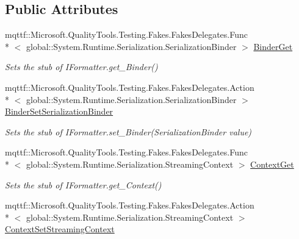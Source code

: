 \subsection*{Public Attributes}
\begin{DoxyCompactItemize}
\item 
mqttf\-::\-Microsoft.\-Quality\-Tools.\-Testing.\-Fakes.\-Fakes\-Delegates.\-Func\\*
$<$ global\-::\-System.\-Runtime.\-Serialization.\-Serialization\-Binder $>$ \hyperlink{class_system_1_1_runtime_1_1_remoting_1_1_messaging_1_1_fakes_1_1_stub_i_remoting_formatter_a4976f8ab0fe1e454d29d12ccabdc4bbf}{Binder\-Get}
\begin{DoxyCompactList}\small\item\em Sets the stub of I\-Formatter.\-get\-\_\-\-Binder()\end{DoxyCompactList}\item 
mqttf\-::\-Microsoft.\-Quality\-Tools.\-Testing.\-Fakes.\-Fakes\-Delegates.\-Action\\*
$<$ global\-::\-System.\-Runtime.\-Serialization.\-Serialization\-Binder $>$ \hyperlink{class_system_1_1_runtime_1_1_remoting_1_1_messaging_1_1_fakes_1_1_stub_i_remoting_formatter_aa34127514fb539c8806ea0e1c717f7be}{Binder\-Set\-Serialization\-Binder}
\begin{DoxyCompactList}\small\item\em Sets the stub of I\-Formatter.\-set\-\_\-\-Binder(\-Serialization\-Binder value)\end{DoxyCompactList}\item 
mqttf\-::\-Microsoft.\-Quality\-Tools.\-Testing.\-Fakes.\-Fakes\-Delegates.\-Func\\*
$<$ global\-::\-System.\-Runtime.\-Serialization.\-Streaming\-Context $>$ \hyperlink{class_system_1_1_runtime_1_1_remoting_1_1_messaging_1_1_fakes_1_1_stub_i_remoting_formatter_a2c4de1f2e75875b4d32f88f904d378b4}{Context\-Get}
\begin{DoxyCompactList}\small\item\em Sets the stub of I\-Formatter.\-get\-\_\-\-Context()\end{DoxyCompactList}\item 
mqttf\-::\-Microsoft.\-Quality\-Tools.\-Testing.\-Fakes.\-Fakes\-Delegates.\-Action\\*
$<$ global\-::\-System.\-Runtime.\-Serialization.\-Streaming\-Context $>$ \hyperlink{class_system_1_1_runtime_1_1_remoting_1_1_messaging_1_1_fakes_1_1_stub_i_remoting_formatter_a6c58a7de2e63875e5fad5ea924acb362}{Context\-Set\-Streaming\-Context}

\end{DoxyCompactItemize}
